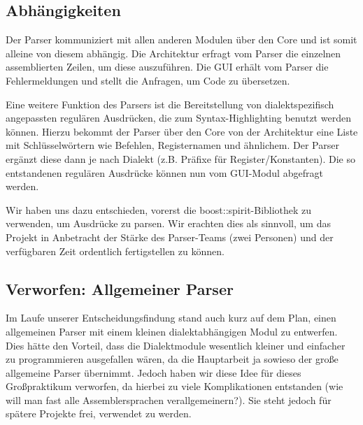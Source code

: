 \subsection{Abhängigkeiten}
Der Parser kommuniziert mit allen anderen Modulen über den Core und ist somit alleine von diesem abhängig.
Die Architektur erfragt vom Parser die einzelnen assemblierten Zeilen, um diese auszuführen.
Die GUI erhält vom Parser die Fehlermeldungen und stellt die Anfragen, um Code zu übersetzen.

Eine weitere Funktion des Parsers ist die Bereitstellung von dialektspezifisch angepassten regulären Ausdrücken, die zum Syntax-Highlighting benutzt werden können.
Hierzu bekommt der Parser über den Core von der Architektur eine Liste mit Schlüsselwörtern wie Befehlen, Registernamen und ähnlichem. Der Parser ergänzt diese dann je nach Dialekt (z.B. Präfixe für Register/Konstanten).
Die so entstandenen regulären Ausdrücke können nun vom GUI-Modul abgefragt werden.

Wir haben uns dazu entschieden, vorerst die boost::spirit-Bibliothek zu verwenden, um Ausdrücke zu parsen.
Wir erachten dies als sinnvoll, um das Projekt in Anbetracht der Stärke des Parser-Teams (zwei Personen) und der verfügbaren Zeit ordentlich fertigstellen zu können.
\subsection{Verworfen: Allgemeiner Parser}
Im Laufe unserer Entscheidungsfindung stand auch kurz auf dem Plan, einen allgemeinen Parser mit einem kleinen dialektabhängigen Modul zu entwerfen.
Dies hätte den Vorteil, dass die Dialektmodule wesentlich kleiner und einfacher zu programmieren ausgefallen wären, da die Hauptarbeit ja sowieso der große allgemeine Parser übernimmt.
Jedoch haben wir diese Idee für dieses Großpraktikum verworfen, da hierbei zu viele Komplikationen entstanden (wie will man fast alle Assemblersprachen verallgemeinern?).
Sie steht jedoch für spätere Projekte frei, verwendet zu werden.
